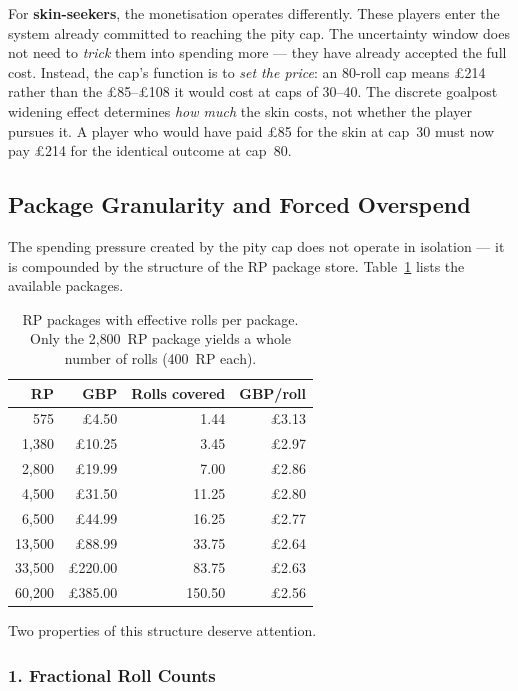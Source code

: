 \documentclass[11pt, a4paper]{article}
\begin{document}
For \textbf{skin-seekers}, the monetisation operates differently.
These players enter the system already committed to reaching the
pity cap. The uncertainty window does not need to \emph{trick} them
into spending more --- they have already accepted the full cost. Instead,
the cap's function is to \emph{set the price}: an 80-roll cap means
\pounds214 rather than the \pounds85--\pounds108 it would cost at
caps of 30--40. The discrete goalpost widening effect determines
\emph{how much} the skin costs, not whether the player pursues it.
A player who would have paid \pounds85 for the skin at cap~30 must
now pay \pounds214 for the identical outcome at cap~80.


\subsection{Package Granularity and Forced Overspend}
\label{sec:synthesis-packages}

The spending pressure created by the pity cap does not operate in
isolation --- it is compounded by the structure of the RP package
store. Table~\ref{tab:packages} lists the available packages.

\begin{table}[H]
\centering
\caption{RP packages with effective rolls per package. Only the
2{,}800~RP package yields a whole number of rolls (400~RP each).}
\label{tab:packages}
\begin{tabular}{r r r r}
\toprule
RP & GBP & Rolls covered & GBP/roll \\
\midrule
575      & \pounds4.50   & 1.44  & \pounds3.13 \\
1{,}380  & \pounds10.25  & 3.45  & \pounds2.97 \\
2{,}800  & \pounds19.99  & 7.00  & \pounds2.86 \\
4{,}500  & \pounds31.50  & 11.25 & \pounds2.80 \\
6{,}500  & \pounds44.99  & 16.25 & \pounds2.77 \\
13{,}500 & \pounds88.99  & 33.75 & \pounds2.64 \\
33{,}500 & \pounds220.00 & 83.75 & \pounds2.63 \\
60{,}200 & \pounds385.00 & 150.50 & \pounds2.56 \\
\bottomrule
\end{tabular}
\end{table}

\noindent Two properties of this structure deserve attention.

\subsubsection*{1. Fractional Roll Counts}
\end{document}
